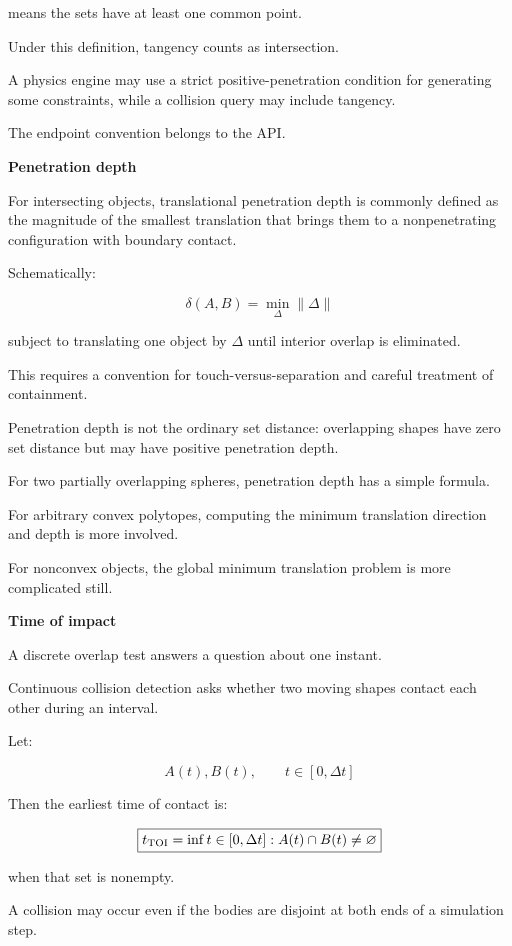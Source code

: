 means the sets have at least one common point.

Under this definition, tangency counts as intersection.

A physics engine may use a strict positive-penetration condition for generating some constraints, while a collision query may include tangency.

The endpoint convention belongs to the API.

\textbf{Penetration depth}

For intersecting objects, translational penetration depth is commonly defined as the magnitude of the smallest translation that brings them to a nonpenetrating configuration with boundary contact.

Schematically:

\[
\boxed{ \delta(A,B)= \min_{\Delta}\|\Delta\| }
\]

subject to translating one object by \(\Delta\) until interior overlap is eliminated.

This requires a convention for touch-versus-separation and careful treatment of containment.

Penetration depth is not the ordinary set distance: overlapping shapes have zero set distance but may have positive penetration depth.

For two partially overlapping spheres, penetration depth has a simple formula.

For arbitrary convex polytopes, computing the minimum translation direction and depth is more involved.

For nonconvex objects, the global minimum translation problem is more complicated still.

\textbf{Time of impact}

A discrete overlap test answers a question about one instant.

Continuous collision detection asks whether two moving shapes contact each other during an interval.

Let:

\[
A(t),B(t),\qquad t\in[0,\Delta t]
\]

Then the earliest time of contact is:

\[
\boxed{ t_{\mathrm{TOI}}= \inf\\{t\in[0,\Delta t]:A(t)\cap B(t)\ne\varnothing\\} }
\]

when that set is nonempty.

A collision may occur even if the bodies are disjoint at both ends of a simulation step.

